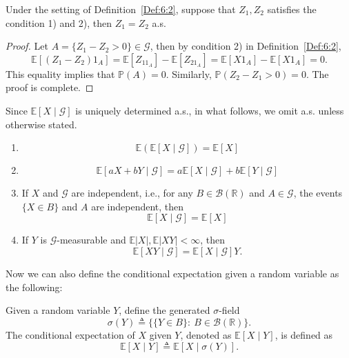 \begin{theorem}
Under the setting of Definition~\ref{Def:6:2},
suppose that $Z_1,Z_2$ satisfies the condition 1) and 2), then 
$Z_1=Z_2$ a.s.
\end{theorem}
\begin{proof}
Let $A=\{Z_1-Z_2>0\}\in\mathcal{G}$, then by condition 2) in Definition~\ref{Def:6:2},
\[
\mathbb{E}[(Z_1-Z_2)1_A] = \mathbb{E}[Z_11_A] - \mathbb{E}[Z_21_A] = 
\mathbb{E}[X1_A]-\mathbb{E}[X1_A]=0.
\]
This equality implies that $\mathbb{P}(A)=0$. Similarly, $\mathbb{P}(Z_2-Z_1>0)=0$.
The proof is complete.
\end{proof}

\begin{remark}
Since $\mathbb{E}[X\mid \mathcal{G}]$ is uniquely determined a.s., in what follows, we omit a.s. unless otherwise stated.
\end{remark}

\begin{proposition}\quad
\begin{enumerate}
\item
\[
\mathbb{E}(\mathbb{E}[X\mid \mathcal{G}]) = \mathbb{E}[X]
\]
\item
\[
\mathbb{E}[aX+bY\mid \mathcal{G}] = a\mathbb{E}[X\mid \mathcal{G}] + b\mathbb{E}[Y\mid \mathcal{G}]
\]
\item
If $X$ and $\mathcal{G}$ are independent, i.e., for any $B\in\mathcal{B}(\mathbb{R})$ and $A\in\mathcal{G}$,
the events $\{X\in B\}$ and $A$ are independent, then
\[
\mathbb{E}[X\mid \mathcal{G}] = \mathbb{E}[X]
\]
\item
If $Y$ is $\mathcal{G}$-measurable and $\mathbb{E}|X|,\mathbb{E}|XY|<\infty$, then
\[
\mathbb{E}[XY\mid \mathcal{G}] = \mathbb{E}[X\mid \mathcal{G}]Y.
\]
\end{enumerate}
\end{proposition}

Now we can also define the conditional expectation given a random variable as the following:
\begin{definition}
Given a random variable $Y$, define the generated $\sigma$-field
\[
\sigma(Y)\triangleq\{\{Y\in B\}:~B\in\mathcal{B}(\mathbb{R})\}.
\]
The conditional expectation of $X$ given $Y$, denoted as $\mathbb{E}[X\mid Y]$, is defined as
\[
\mathbb{E}[X\mid Y]\triangleq\mathbb{E}[X\mid \sigma(Y)].
\]
\end{definition}

